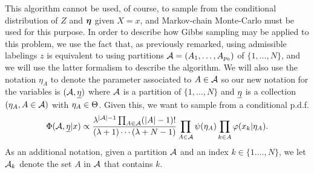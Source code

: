 This algorithm cannot be used, of course, to sample from the conditional distribution of $Z$ and ${\bm{\eta}}$ given $X=x$, and Markov-chain Monte-Carlo must be used for this purpose.  In order  to describe how Gibbs sampling may be applied to this problem, we  use the fact that, as previously remarked, using admissible labelings $z$ is equivalent to using partitions ${\mathcal A} = (A_1, \ldots, A_{p_0})$ of $\{1, \ldots, N\}$, and we will use the latter formalism to describe the algorithm. We will also use the notation $\eta_A$ to denote the parameter associated to $A\in {\mathcal A}$ so our new notation for the variables is $({\mathcal A}, {\underline{\eta}})$ where ${\mathcal A}$ is a partition of $\{1, \ldots, N\}$ and ${\underline{\eta}}$ is a collection $(\eta_A, A\in {\mathcal A})$ with $\eta_A \in \Theta$.
Given this, we want to sample from a conditional p.d.f.
\begin{equation}
\label{eq:dp.mix.cond}
\Phi({\mathcal A}, {\underline{\eta}} | x) \propto \frac{\lambda^{|{\mathcal A}|-1} \prod_{A\in{\mathcal A}} (|A|-1)!}{(\lambda+1) \cdots (\lambda+N-1)} \prod_{A \in {\mathcal A}} \psi(\eta_A) \prod_{k\in A}  \varphi(x_k|\eta_A). 
\end{equation}
As an additional notation, given a partition ${\mathcal A}$ and an index $k\in \{1. \ldots, N\}$, we let ${\mathcal A}_k$ denote the set $A$ in ${\mathcal A}$ that contains $k$.

